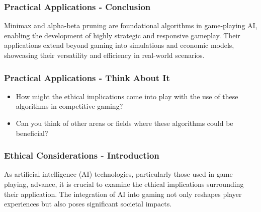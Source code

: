 \documentclass[aspectratio=169]{beamer}
\begin{document}
\begin{frame}[fragile]
    \frametitle{Practical Applications - Conclusion}
    Minimax and alpha-beta pruning are foundational algorithms in game-playing AI, enabling the development of highly strategic and responsive gameplay. Their applications extend beyond gaming into simulations and economic models, showcasing their versatility and efficiency in real-world scenarios.
\end{frame}

\begin{frame}[fragile]
    \frametitle{Practical Applications - Think About It}
    \begin{itemize}
        \item How might the ethical implications come into play with the use of these algorithms in competitive gaming?
        \item Can you think of other areas or fields where these algorithms could be beneficial?
    \end{itemize}
\end{frame}

\begin{frame}[fragile]
    \frametitle{Ethical Considerations - Introduction}
    As artificial intelligence (AI) technologies, particularly those used in game playing, advance, it is crucial to examine the ethical implications surrounding their application. 
    The integration of AI into gaming not only reshapes player experiences but also poses significant societal impacts.
\end{frame}
\end{document}
